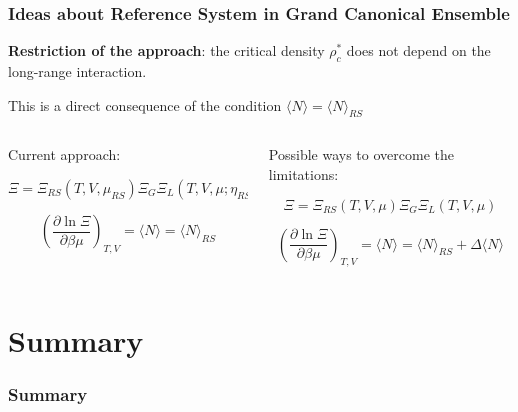 \documentclass[8pt]{beamer}
\begin{document}
	\begin{frame}
		\frametitle{Ideas about Reference System in Grand Canonical Ensemble}
		
		\textbf{Restriction of the approach}: the critical density $\rho^*_c$ does not depend on the long-range interaction.
		
		This is a direct consequence of the condition $\langle N \rangle = \langle N \rangle_{RS}$
		
		\vspace{10mm}
		
		\begin{columns}
			\begin{column}{0.5\textwidth}
				Current approach:
				
				\begin{equation*}
					\Xi = \Xi_{RS}(T,V,\mu_{RS}) \Xi_G \Xi_L(T, V, \mu; \eta_{RS})
				\end{equation*}
				
				\begin{equation*}
					\left(\frac{\partial \ln \Xi}{\partial \beta\mu}\right)_{T,V} = \langle N \rangle = \langle N \rangle_{RS}
				\end{equation*}
			\end{column}
			
			\begin{column}{0.5\textwidth}
				Possible ways to overcome the limitations:
				
				\begin{equation*}
					\Xi = \Xi_{RS}(T,V,\mu) \Xi_G \Xi_L(T, V, \mu)
				\end{equation*}
				
				\begin{equation*}
					\left(\frac{\partial \ln \Xi}{\partial \beta\mu}\right)_{T,V} = \langle N \rangle = \langle N \rangle_{RS} + \Delta \langle N \rangle
				\end{equation*}
			\end{column}
			
			
		\end{columns}
	\end{frame}
	
	\section{Summary}
	
	\begin{frame}
		\frametitle{Summary}
	\end{frame}
	
	
	
\end{document}
